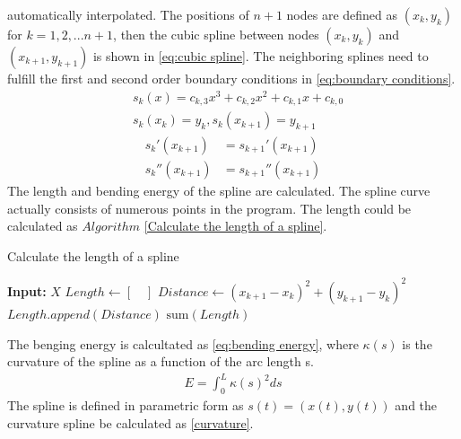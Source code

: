     automatically interpolated. The positions of $n+1$ nodes are defined as $(x_k, y_k)$ for $k = 1, 2, ...n+1$, then the cubic spline between nodes $(x_k, y_k)$ and $(x_{k+1}, y_{k+1})$ is shown in
    \autoref{eq:cubic spline}. The neighboring splines need to fulfill the first and second order boundary conditions in \autoref{eq:boundary conditions}. 
    \begin{equation}
        \begin{aligned}
            &s_k(x) =  c_{k,3}x^3+c_{k,2}x^2+c_{k,1}x+c_{k,0}\\
            &s_k(x_k) = y_k,  s_k(x_{k+1}) = y_{k+1}
            \label{eq:cubic spline}
        \end{aligned}
    \end{equation}
    \begin{equation}
        \begin{aligned}
            s_k'(x_{k+1}) &= s_{k+1}'(x_{k+1})\\
            s_k''(x_{k+1}) &= s_{k+1}''(x_{k+1})
            \label{eq:boundary conditions}
        \end{aligned}
    \end{equation}
    The length and bending energy of the spline are calculated. The spline curve actually consists of numerous points in the program. The length could be calculated
    as $Algorithm$ \autoref{Calculate the length of a spline}.
    \begin{algorithm} 
        \caption{Calculate the length of a spline}
        \label{Calculate the length of a spline}
        \begin{algorithmic}[1]
        \STATE \textbf{Input:} $X$
        \STATE $Length \leftarrow [\quad]$
            \STATE $Distance \leftarrow (x_{k+1}-x_{k})^2+(y_{k+1}-y_{k})^2$
            \STATE $Length.append(Distance)$
        \ENDFOR
        \RETURN $\text{sum}(Length)$
        \end{algorithmic}
    \end{algorithm}
    The benging energy is calcultated as \autoref{eq:bending energy}, where $\kappa(s)$ is the curvature of the spline as a function of the arc length s.
    \begin{equation}
        \begin{aligned}
            E = \int_{0}^{L} \kappa(s)^2ds
            \label{eq:bending energy}
        \end{aligned}
    \end{equation}
    The spline is defined in parametric form as $s(t) = (x(t),y(t))$ and the curvature spline be calculated as \autoref{curvature}. 
